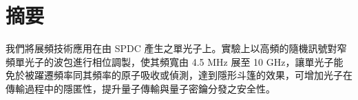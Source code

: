 \documentclass[class=NCU_thesis, crop=false]{standalone}
\begin{document}
\chapter{摘要}
我們將展頻技術應用在由 SPDC 產生之單光子上。實驗上以高頻的隨機訊號對窄頻單光子的波包進行相位調製，使其頻寬由 4.5 MHz 展至 10 GHz，讓單光子能免於被躍遷頻率同其頻率的原子吸收或偵測，達到隱形斗篷的效果，可增加光子在傳輸過程中的隱匿性，提升量子傳輸與量子密鑰分發之安全性。


\vspace{2em}
\end{document}
